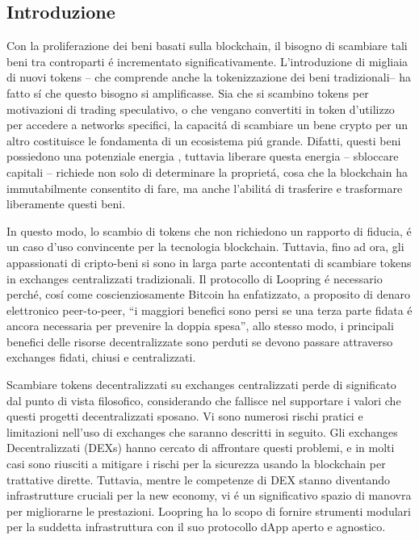 \documentclass[UTF8,nofonts]{article}
\begin{document}
\begin{multicols}{2}
\section{Introduzione\label{sec:introduction}}

 Con la proliferazione dei beni  basati sulla blockchain, il bisogno di scambiare tali beni tra controparti \'e incrementato significativamente. L'introduzione di migliaia di nuovi tokens –  che comprende anche la tokenizzazione dei beni tradizionali–  ha fatto s\'i che questo bisogno si amplificasse. Sia che si scambino tokens per motivazioni di trading speculativo, o che vengano convertiti in token d'utilizzo per accedere a networks specifici, la capacit\'a di scambiare un bene crypto per un altro costituisce le fondamenta di un ecosistema pi\'u grande. Difatti, questi beni  possiedono una potenziale energia \cite{desotocapital}, tuttavia liberare questa energia – sbloccare capitali –   richiede non solo di determinare la propriet\'a, cosa che la blockchain ha immutabilmente consentito di fare, ma anche l'abilit\'a di trasferire e trasformare liberamente questi beni.

 In questo modo, lo scambio di tokens che non richiedono un rapporto di fiducia, \'e un caso d'uso convincente per la tecnologia blockchain. Tuttavia, fino ad ora, gli appassionati di cripto-beni si sono in larga parte accontentati di scambiare tokens in exchanges centralizzati tradizionali. Il protocollo di Loopring \'e necessario perch\'e, cos\'i come coscienziosamente Bitcoin \cite{nakamoto2008bitcoin} ha enfatizzato, a proposito di denaro elettronico peer-to-peer, \enquote{i maggiori benefici sono persi se una terza parte fidata \'e ancora necessaria per prevenire la doppia spesa}, allo stesso modo, i principali benefici delle risorse decentralizzate sono perduti se devono passare attraverso exchanges fidati, chiusi e centralizzati.

Scambiare tokens decentralizzati su exchanges centralizzati perde di significato dal punto di vista filosofico, considerando che fallisce nel supportare i valori che questi progetti decentralizzati sposano. Vi sono numerosi rischi pratici e limitazioni nell'uso di exchanges che saranno descritti in seguito. Gli exchanges Decentralizzati (DEXs) \cite{schuh2015bitshares} \cite{bancor} \cite{kyber} hanno cercato di affrontare questi problemi, e in molti casi sono riusciti a mitigare i rischi per la sicurezza usando la blockchain per trattative dirette. Tuttavia, mentre le competenze di DEX stanno diventando infrastrutture cruciali per la new economy, vi \'e un significativo spazio di manovra per migliorarne le prestazioni. Loopring ha lo scopo di fornire strumenti modulari per la suddetta infrastruttura con il suo  protocollo dApp aperto e agnostico.


\end{multicols}
\end{document}
